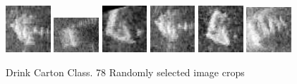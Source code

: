 \begin{figure}
    \includegraphics[width=0.15\textwidth]{chapters/images/dataset/all-class-images/drinkCarton/drinkCarton-314.jpg}
    \includegraphics[width=0.15\textwidth]{chapters/images/dataset/all-class-images/drinkCarton/drinkCarton-65.jpg}
    \includegraphics[width=0.15\textwidth]{chapters/images/dataset/all-class-images/drinkCarton/drinkCarton-173.jpg}
    \includegraphics[width=0.15\textwidth]{chapters/images/dataset/all-class-images/drinkCarton/drinkCarton-287.jpg}
    \includegraphics[width=0.15\textwidth]{chapters/images/dataset/all-class-images/drinkCarton/drinkCarton-150.jpg}
    \includegraphics[width=0.15\textwidth]{chapters/images/dataset/all-class-images/drinkCarton/drinkCarton-91.jpg}
    
    \caption{Drink Carton Class. 78 Randomly selected image crops}
    \label{appendix:drinkCarton}
\end{figure}

